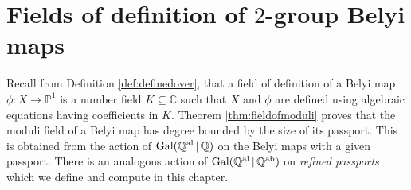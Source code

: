 \documentclass{dcthesis}
\newcommand{\PP}{\mathbb P}
\newcommand{\CC}{\mathbb C}
\newcommand{\QQ}{\mathbb Q}
\newcommand{\defi}[1]{\textsf{#1}}
\newcommand{\mm}[1]{{\color{blue} \sf MM: [#1]}}
\newcommand{\QQal}{{\mathbb Q}^{\textup{al}}}
\newcommand{\QQab}{{\mathbb Q}^{\textup{ab}}}
\DeclareMathOperator{\Gal}{Gal}
\numberwithin{equation}{section}
\newtheorem{theorem}[equation]{Theorem}
\theoremstyle{definition}
\newtheorem{definition}[equation]{Definition}
\theoremstyle{remark}
\begin{document}
{\chapter{Fields of definition of $2$-group Belyi maps}{\label{chapter:fieldsofdefinition}
  Recall from Definition
  \ref{def:definedover},
  that a field of definition of a Belyi map
  $\phi\colon X\to\PP^1$
  is a number field
  $K\subseteq\CC$
  such that $X$ and $\phi$
  are defined using algebraic equations
  having coefficients in $K$.
  Theorem
  \ref{thm:fieldofmoduli}
  proves
  that the moduli field of a Belyi map
  has degree bounded by the size of its
  passport.
  This is obtained from the action
  of $\Gal(\QQal\,|\,\QQ)$
  on the Belyi maps with a given passport.
  There is an analogous action of
  $\Gal(\QQal\,|\,\QQab)$
  on \emph{refined passports}
  which we define and compute in this chapter.
}}
\end{document}
